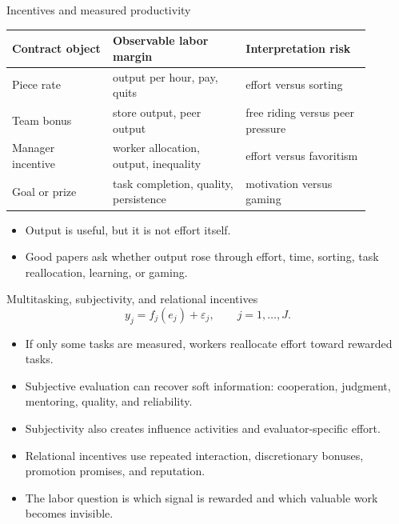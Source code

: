\documentclass[aspectratio=169,11pt]{beamer}
\begin{document}
\begin{frame}{Incentives and measured productivity}
\small
\begin{tabular}{p{0.25\linewidth} p{0.33\linewidth} p{0.31\linewidth}}
\toprule
Contract object & Observable labor margin & Interpretation risk \\
\midrule
Piece rate & output per hour, pay, quits & effort versus sorting \\
Team bonus & store output, peer output & free riding versus peer pressure \\
Manager incentive & worker allocation, output, inequality & effort versus favoritism \\
Goal or prize & task completion, quality, persistence & motivation versus gaming \\
\bottomrule
\end{tabular}
\vspace{0.25cm}
\begin{itemize}
    \item Output is useful, but it is not effort itself.
    \item Good papers ask whether output rose through effort, time, sorting, task reallocation, learning, or gaming.
\end{itemize}
\end{frame}

\begin{frame}{Multitasking, subjectivity, and relational incentives}
\small
\[
  y_j = f_j(e_j) + \varepsilon_j,
  \qquad j=1,\dots,J.
\]
\begin{itemize}
    \item If only some tasks are measured, workers reallocate effort toward rewarded tasks.
    \item Subjective evaluation can recover soft information: cooperation, judgment, mentoring, quality, and reliability.
    \item Subjectivity also creates influence activities and evaluator-specific effort.
    \item Relational incentives use repeated interaction, discretionary bonuses, promotion promises, and reputation.
    \item The labor question is which signal is rewarded and which valuable work becomes invisible.
\end{itemize}
\end{frame}
\end{document}
